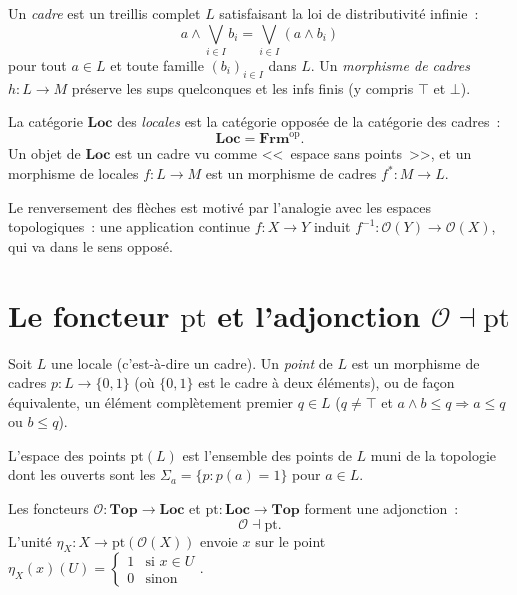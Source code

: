 \begin{definition}
Un \emph{cadre} est un treillis complet $L$ satisfaisant la loi de distributivit\'e infinie~:
\[
  a \wedge \bigvee_{i\in I} b_i = \bigvee_{i\in I}(a \wedge b_i)
\]
pour tout $a \in L$ et toute famille $(b_i)_{i\in I}$ dans $L$.
Un \emph{morphisme de cadres} $h\colon L \to M$ pr\'eserve les sups quelconques et les
infs finis (y compris $\top$ et $\bot$).
\end{definition}

\begin{definition}[Locale]
La cat\'egorie $\mathbf{Loc}$ des \emph{locales} est la cat\'egorie oppos\'ee de la
cat\'egorie des cadres~:
\[
  \mathbf{Loc} = \mathbf{Frm}^{\mathrm{op}}.
\]
Un objet de $\mathbf{Loc}$ est un cadre vu comme <<~espace sans points~>>, et un morphisme
de locales $f\colon L \to M$ est un morphisme de cadres $f^*\colon M \to L$.
\end{definition}

\begin{remarque}
Le renversement des fl\`eches est motiv\'e par l'analogie avec les espaces topologiques~:
une application continue $f\colon X \to Y$ induit $f^{-1}\colon \mathcal{O}(Y) \to
\mathcal{O}(X)$, qui va dans le sens oppos\'e.
\end{remarque}

\section{Le foncteur $\mathrm{pt}$ et l'adjonction $\mathcal{O} \dashv \mathrm{pt}$}

\begin{definition}
Soit $L$ une locale (c'est-\`a-dire un cadre). Un \emph{point} de $L$ est un morphisme de
cadres $p\colon L \to \{0,1\}$ (o\`u $\{0,1\}$ est le cadre \`a deux \'el\'ements), ou de
fa\c{c}on \'equivalente, un \'el\'ement compl\`etement premier $q \in L$ ($q \neq \top$ et
$a \wedge b \leq q \Rightarrow a \leq q$ ou $b \leq q$).

L'espace des points $\mathrm{pt}(L)$ est l'ensemble des points de $L$ muni de la topologie
dont les ouverts sont les $\Sigma_a = \{p : p(a) = 1\}$ pour $a \in L$.
\end{definition}

\begin{theoreme}
Les foncteurs $\mathcal{O}\colon \mathbf{Top} \to \mathbf{Loc}$ et
$\mathrm{pt}\colon \mathbf{Loc} \to \mathbf{Top}$ forment une adjonction~:
\[
  \mathcal{O} \dashv \mathrm{pt}.
\]
L'unit\'e $\eta_X\colon X \to \mathrm{pt}(\mathcal{O}(X))$ envoie $x$ sur le point
$\eta_X(x)(U) = \begin{cases} 1 & \text{si } x \in U \\ 0 & \text{sinon}\end{cases}$.
\end{theoreme}

